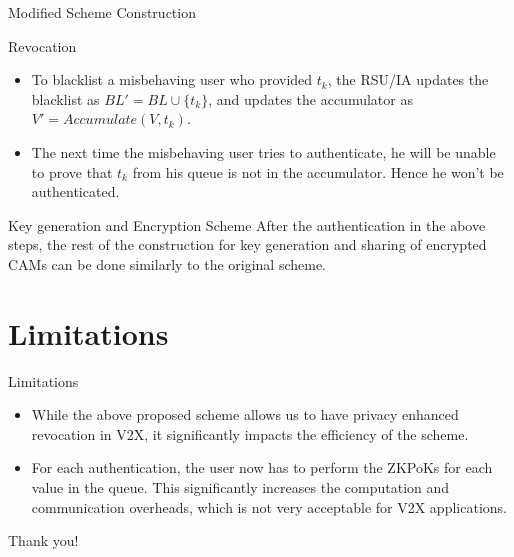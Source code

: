 \documentclass[
	xcolor={svgnames},
	hyperref={pagebackref,bookmarks},
	aspectratio=43,
]{beamer}
\begin{document}
\begin{frame}{Modified Scheme Construction}
	\begin{block}{Revocation}
		\begin{itemize}
			\item To blacklist a misbehaving user who provided $t_k$, the RSU/IA updates the blacklist as $BL' = BL \cup \{ t_k \}$, and updates the accumulator as $V' = Accumulate(V, t_k)$.
			\item The next time the misbehaving user tries to authenticate, he will be unable to prove that $t_k$ from his queue is not in the accumulator. Hence he won't be authenticated.
		\end{itemize}
	\end{block}
	\begin{block}{Key generation and Encryption Scheme}
		After the authentication in the above steps, the rest of the construction for key generation and sharing of encrypted CAMs can be done similarly to the original scheme.
	\end{block}
\end{frame}

\section{Limitations}
\begin{frame}{Limitations}
	\begin{itemize}
		\item While the above proposed scheme allows us to have privacy enhanced revocation in V2X, it significantly impacts the efficiency of the scheme.
		\item For each authentication, the user now has to perform the ZKPoKs for each value in the queue. This significantly increases the computation and communication overheads, which is not very acceptable for V2X applications.
	\end{itemize}
\end{frame}

\begin{frame}
	\begin{center}
		\huge Thank you!
	\end{center}
\end{frame}
\end{document}
